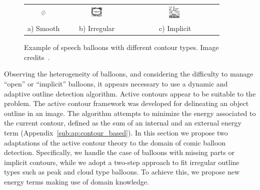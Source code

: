 	\begin{figure}[!ht]%
	\begin{center}
	  \begin{tabular}{ccc}
	  \includegraphics[trim= 0px 2px 0mm 0mm, clip, width=0.13\textwidth]{round_balloon.png}&
	  \includegraphics[trim= 0mm 0mm 0mm 0mm, clip, width=0.17\textwidth]{peaked_balloon.png}&
	  \includegraphics[trim= 15px 7mm 5px 0mm, clip, width=0.145\textwidth]{open_balloon.png} \\ 
	  \footnotesize a) Smooth	& \footnotesize b) Irregular & \footnotesize c) Implicit
	  \end{tabular}
	\caption[Speech balloon contour types]{Example of speech balloons with different contour types. Image credits~\cite{Bubble09}.}
	\label{fig:se:balloon_examples}
	\end{center}
	\end{figure}	

Observing the heterogeneity of balloons, and considering the difficulty to manage ``open'' or ``implicit'' balloons, it appears necessary to use a dynamic and adaptive outline detection algorithm.
Active contours appear to be suitable to the problem.
The active contour framework was developed for delineating an object outline in an image.
The algorithm attempts to minimize the energy associated to the current contour, defined as the sum of an internal and an external energy term (Appendix~\ref{sub:ap:contour_based}). 
In this section we propose two adaptations of the active contour theory to the domain of comic balloon detection.
Specifically, we handle the case of balloons with missing parts or implicit contours, while we adopt a two-step approach to fit irregular outline types such as peak and cloud type balloons. 
To achieve this, we propose new energy terms making use of domain knowledge.


